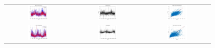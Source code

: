 \begin{figure}[ht!]
  \centering
  \begin{tabular}{ccc}
    \includegraphics[width=0.32\textwidth]{graphs/hybrid/36 hours/mean_fr/actual vs forecast.jpg} &
    \includegraphics[width=0.32\textwidth]{graphs/hybrid/36 hours/mean_fr/residuals.jpg} &
    \includegraphics[width=0.32\textwidth]{graphs/hybrid/36 hours/mean_fr/scatter plot.jpg} \\
    \includegraphics[width=0.32\textwidth]{graphs/hybrid/36 hours/s_wht/actual vs forecast.jpg} &
    \includegraphics[width=0.32\textwidth]{graphs/hybrid/36 hours/s_wht/residuals.jpg} &
    \includegraphics[width=0.32\textwidth]{graphs/hybrid/36 hours/s_wht/scatter plot.jpg} \\

\end{tabular}
\end{figure}
